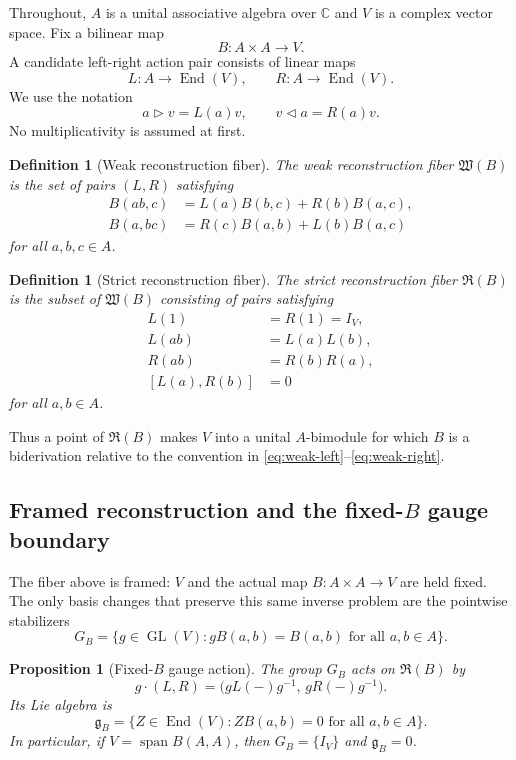 \documentclass[11pt]{amsart}
\newtheorem{proposition}[theorem]{Proposition}
\newtheorem{definition}[theorem]{Definition}
\newcommand{\End}{\operatorname{End}}
\newcommand{\Span}{\operatorname{span}}
\newcommand{\Wfib}{\mathfrak W}
\newcommand{\Rfib}{\mathfrak R}
\newcommand{\C}{\mathbb C}
\begin{document}
Throughout, $A$ is a unital associative algebra over $\C$ and $V$ is a complex vector space.  Fix a bilinear map
\[
B:A\times A\longrightarrow V.
\]
A candidate left-right action pair consists of linear maps
\[
L:A\longrightarrow\End(V),
\qquad
R:A\longrightarrow\End(V).
\]
We use the notation
\[
a\triangleright v=L(a)v,
\qquad
v\triangleleft a=R(a)v.
\]
No multiplicativity is assumed at first.

\begin{definition}[Weak reconstruction fiber]
The weak reconstruction fiber $\Wfib(B)$ is the set of pairs $(L,R)$ satisfying
\begin{align}
B(ab,c)&=L(a)B(b,c)+R(b)B(a,c), \label{eq:weak-left}\\
B(a,bc)&=R(c)B(a,b)+L(b)B(a,c) \label{eq:weak-right}
\end{align}
for all $a,b,c\in A$.
\end{definition}

\begin{definition}[Strict reconstruction fiber]
The strict reconstruction fiber $\Rfib(B)$ is the subset of $\Wfib(B)$ consisting of pairs satisfying
\begin{align}
L(1)&=R(1)=I_V, \label{eq:unit}\\
L(ab)&=L(a)L(b), \label{eq:left-rep}\\
R(ab)&=R(b)R(a), \label{eq:right-rep}\\
[L(a),R(b)]&=0 \label{eq:commuting-actions}
\end{align}
for all $a,b\in A$.
\end{definition}

Thus a point of $\Rfib(B)$ makes $V$ into a unital $A$-bimodule for which $B$ is a biderivation relative to the convention in \eqref{eq:weak-left}--\eqref{eq:weak-right}.

\subsection{Framed reconstruction and the fixed-$B$ gauge boundary}\label{sec:gauge-boundary}
The fiber above is framed: $V$ and the actual map $B:A\times A\to V$ are held fixed.  The only basis changes that preserve this same inverse problem are the pointwise stabilizers
\[
G_B=\{g\in\operatorname{GL}(V):gB(a,b)=B(a,b)\text{ for all }a,b\in A\}.
\]

\begin{proposition}[Fixed-$B$ gauge action]\label{prop:fixed-B-gauge}
The group $G_B$ acts on $\Rfib(B)$ by
\[
g\cdot(L,R)=\bigl(gL(\mathord{-})g^{-1},\,gR(\mathord{-})g^{-1}\bigr).
\]
Its Lie algebra is
\[
\mathfrak g_B=\{Z\in\operatorname{End}(V):ZB(a,b)=0\text{ for all }a,b\in A\}.
\]
In particular, if $V=\Span B(A,A)$, then $G_B=\{I_V\}$ and $\mathfrak g_B=0$.
\end{proposition}
\end{document}
